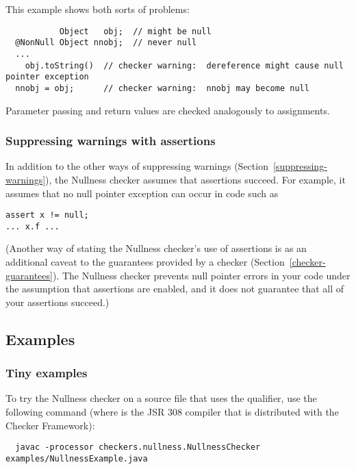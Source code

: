 This example shows both sorts of problems:

\begin{Verbatim}
           Object   obj;  // might be null
  @NonNull Object nnobj;  // never null
  ...
    obj.toString()  // checker warning:  dereference might cause null pointer exception
  nnobj = obj;      // checker warning:  nnobj may become null
\end{Verbatim}

Parameter passing and return values are checked analogously to assignments.



\subsubsection{Suppressing warnings with assertions\label{suppressing-warnings-with-assertions}}

In addition to the other ways of suppressing warnings
(Section~\ref{suppressing-warnings}), the Nullness checker 
assumes that assertions succeed.  For example, it assumes that no null
pointer exception can occur in code such as
\begin{Verbatim}
assert x != null;
... x.f ...
\end{Verbatim}

(Another way of stating the Nullness checker's use of assertions is as an
additional caveat to the guarantees provided by a checker
(Section~\ref{checker-guarantees}).  The Nullness checker prevents null
pointer errors in your code under the assumption that assertions are
enabled, and it does not guarantee that all of your assertions succeed.)



\subsection{Examples\label{nullness-example}}

\subsubsection{Tiny examples\label{nullness-tiny-examples}}

To try the Nullness checker on a source file that uses the  qualifier,
use the following command (where  is the JSR 308 compiler that
is distributed with the Checker Framework):

\begin{Verbatim}
  javac -processor checkers.nullness.NullnessChecker examples/NullnessExample.java
\end{Verbatim}

